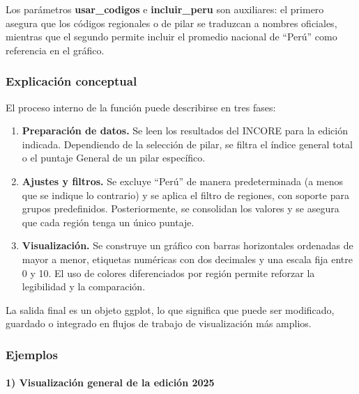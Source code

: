 \documentclass[
  11pt,
  letterpaper,
  DIV=11,
  numbers=noendperiod]{scrartcl}
\makeatletter
\let\oldparagraph\paragraph
\renewcommand{\paragraph}{
    \@ifstar
      \xxxParagraphStar
      \xxxParagraphNoStar
  }
\newcommand{\xxxParagraphStar}[1]{\oldparagraph*{#1}\mbox{}}
\newcommand{\xxxParagraphNoStar}[1]{\oldparagraph{#1}\mbox{}}
\makeatother
\begin{document}
Los parámetros \textbf{usar\_codigos} e \textbf{incluir\_peru} son
auxiliares: el primero asegura que los códigos regionales o de pilar se
traduzcan a nombres oficiales, mientras que el segundo permite incluir
el promedio nacional de ``Perú'' como referencia en el gráfico.

\subsubsection{\texorpdfstring{\textbf{Explicación
conceptual}}{Explicación conceptual}}\label{explicaciuxf3n-conceptual-1}

El proceso interno de la función puede describirse en tres fases:

\begin{enumerate}
\def\labelenumi{\arabic{enumi}.}
\item
  \textbf{Preparación de datos.} Se leen los resultados del INCORE para
  la edición indicada. Dependiendo de la selección de pilar, se filtra
  el índice general total o el puntaje General de un pilar específico.
\item
  \textbf{Ajustes y filtros.} Se excluye ``Perú'' de manera
  predeterminada (a menos que se indique lo contrario) y se aplica el
  filtro de regiones, con soporte para grupos predefinidos.
  Posteriormente, se consolidan los valores y se asegura que cada región
  tenga un único puntaje.
\item
  \textbf{Visualización.} Se construye un gráfico con barras
  horizontales ordenadas de mayor a menor, etiquetas numéricas con dos
  decimales y una escala fija entre 0 y 10. El uso de colores
  diferenciados por región permite reforzar la legibilidad y la
  comparación.
\end{enumerate}

La salida final es un objeto ggplot, lo que significa que puede ser
modificado, guardado o integrado en flujos de trabajo de visualización
más amplios.

\subsubsection{\texorpdfstring{\textbf{Ejemplos}}{Ejemplos}}\label{ejemplos-1}

\paragraph{\texorpdfstring{\textbf{1) Visualización general de la
edición
2025}}{1) Visualización general de la edición 2025}}\label{visualizaciuxf3n-general-de-la-ediciuxf3n-2025}
\end{document}
